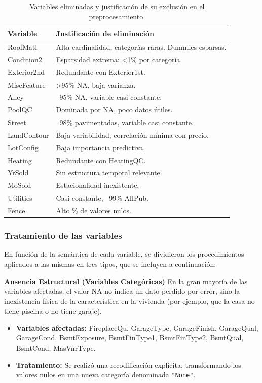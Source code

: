 \documentclass[a4paper,twocolumn]{article}
\begin{document}
	\begin{table}[tb]
		\centering
		{\footnotesize
		\caption{Variables eliminadas y justificación de su exclusión en el preprocesamiento.}
		\label{tab:variables_eliminadas}
		\begin{tabular}{|l|p{4.5cm}|}
			\hline\hline
			\textbf{Variable} & \textbf{Justificación de eliminación} \\\hline
			RoofMatl & Alta cardinalidad, categorías raras. Dummies esparsas. \\\hline
			Condition2 & Esparsidad extrema: <1\% por categoría. \\\hline
			Exterior2nd & Redundante con Exterior1st. \\\hline
			MiscFeature & >95\% NA, baja varianza. \\\hline
			Alley & ~95\% NA, variable casi constante. \\\hline
			PoolQC & Dominada por NA, poco datos útiles. \\\hline
			Street & ~98\% pavimentadas, variable casi constante. \\\hline
			LandContour & Baja variabilidad, correlación mínima con precio. \\\hline
			LotConfig & Baja importancia predictiva. \\\hline
			Heating & Redundante con HeatingQC. \\\hline
			YrSold & Sin estructura temporal relevante. \\\hline
			MoSold & Estacionalidad inexistente. \\\hline
			Utilities & Casi constante, ~99\% AllPub. \\\hline\hline
			Fence & Alto \% de valores nulos. \\\hline\hline
		\end{tabular}
		}
		\end{table}

	\subsubsection{Tratamiento de las variables}

	En función de la semántica de cada variable, se dividieron los procedimientos aplicados a las mismas en tres tipos, que se incluyen a continuación:

	\vspace{0.2cm}

	\textbf{Ausencia Estructural (Variables Categóricas)} En la gran mayoría de las variables afectadas, el valor NA no indica un dato perdido por error, sino la inexistencia física de la característica en la vivienda (por ejemplo, que la casa no tiene piscina o no tiene garaje).
	\begin{itemize}
		\item \textbf{Variables afectadas:} FireplaceQu, GarageType, GarageFinish, GarageQual, GarageCond, BsmtExposure, BsmtFinType1, BsmtFinType2, BsmtQual, BsmtCond, MasVnrType.
		\item \textbf{Tratamiento:} Se realizó una recodificación explícita, transformando los valores nulos en una nueva categoría denominada \texttt{"None"}.
	\end{itemize}
\end{document}
